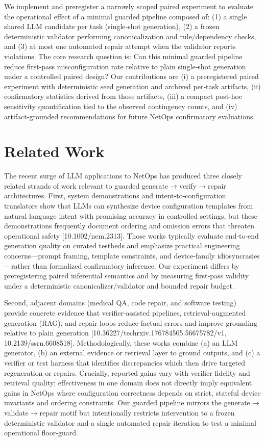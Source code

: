 \documentclass[conference]{IEEEtran}
\begin{document}
We implement and preregister a narrowly scoped paired experiment to evaluate the operational effect of a minimal guarded pipeline composed of: (1) a single shared LLM candidate per task (single‑shot generation), (2) a frozen deterministic validator performing canonicalization and rule/dependency checks, and (3) at most one automated repair attempt when the validator reports violations. The core research question is: Can this minimal guarded pipeline reduce first‑pass misconfiguration rate relative to plain single‑shot generation under a controlled paired design? Our contributions are (i) a preregistered paired experiment with deterministic seed generation and archived per‑task artifacts, (ii) confirmatory statistics derived from those artifacts, (iii) a compact post‑hoc sensitivity quantification tied to the observed contingency counts, and (iv) artifact‑grounded recommendations for future NetOps confirmatory evaluations.

\section{Related Work}
The recent surge of LLM applications to NetOps has produced three closely related strands of work relevant to guarded generate\ensuremath{\rightarrow}verify\ensuremath{\rightarrow}repair architectures. First, system demonstrations and intent‑to‑configuration translators show that LLMs can synthesize device configuration templates from natural language intent with promising accuracy in controlled settings, but these demonstrations frequently document ordering and omission errors that threaten operational safety [10.1002/nem.2313]. Those works typically evaluate end‑to‑end generation quality on curated testbeds and emphasize practical engineering concerns---prompt framing, template constraints, and device‑family idiosyncrasies---rather than formalized confirmatory inference. Our experiment differs by preregistering paired inferential semantics and by measuring first‑pass validity under a deterministic canonicalizer/validator and bounded repair budget.

Second, adjacent domains (medical QA, code repair, and software testing) provide concrete evidence that verifier‑assisted pipelines, retrieval‑augmented generation (RAG), and repair loops reduce factual errors and improve grounding relative to plain generation [10.36227/techrxiv.176784505.56675782/v1, 10.2139/ssrn.6608518]. Methodologically, these works combine (a) an LLM generator, (b) an external evidence or retrieval layer to ground outputs, and (c) a verifier or test harness that identifies discrepancies which then drive targeted regeneration or repairs. Crucially, reported gains vary with verifier fidelity and retrieval quality; effectiveness in one domain does not directly imply equivalent gains in NetOps where configuration correctness depends on strict, stateful device invariants and ordering constraints. Our guarded pipeline mirrors the generate\ensuremath{\rightarrow}validate\ensuremath{\rightarrow}repair motif but intentionally restricts intervention to a frozen deterministic validator and a single automated repair iteration to test a minimal operational floor‑guard.
\end{document}
